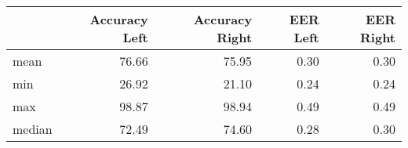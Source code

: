 \begin{tabular}{lrrrr}
\toprule
{} &  Accuracy Left &  Accuracy Right &  EER Left &  EER Right \\
\midrule
mean   &          76.66 &           75.95 &      0.30 &       0.30 \\
min    &          26.92 &           21.10 &      0.24 &       0.24 \\
max    &          98.87 &           98.94 &      0.49 &       0.49 \\
median &          72.49 &           74.60 &      0.28 &       0.30 \\
\bottomrule
\end{tabular}
